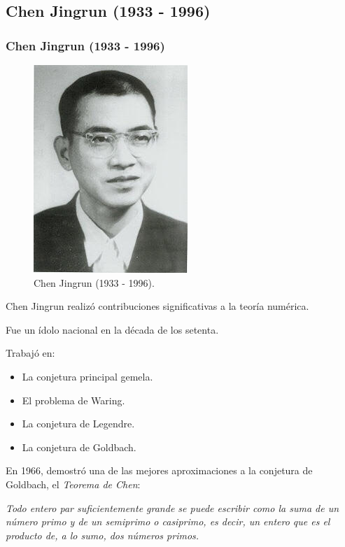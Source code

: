 \documentclass[12pt, aspectratio=169]{beamer} %
\begin{document}
	\subsection{Chen Jingrun (1933 - 1996)}
		\begin{frame}
			\frametitle{Chen Jingrun (1933 - 1996)}
			\begin{figure}
				\centering
				\includegraphics[width = .25\linewidth]{chen_jingrun.jpg}
				\caption{Chen Jingrun (1933 - 1996).}
			\end{figure}
			
		\end{frame}
		\begin{frame}
			Chen Jingrun realizó contribuciones significativas a la teoría numérica.
			
			Fue un ídolo nacional en la década de los setenta.
			
			Trabajó en:
			\begin{itemize}
				\item La conjetura principal gemela.
				\item El problema de Waring.
				\item La conjetura de Legendre.
				\item La conjetura de Goldbach.
			\end{itemize}
		\end{frame}
		
		\begin{frame}
			En 1966, demostró una de las mejores aproximaciones a la conjetura de Goldbach, el \textit{Teorema de Chen}:
			
			\begin{center}
				\em
				Todo entero par suficientemente grande se puede escribir como la suma de un número primo y de un semiprimo
				o casiprimo, es decir, un entero que es el producto de, a lo sumo, dos números primos.
			\end{center}						
		\end{frame}
\end{document}
